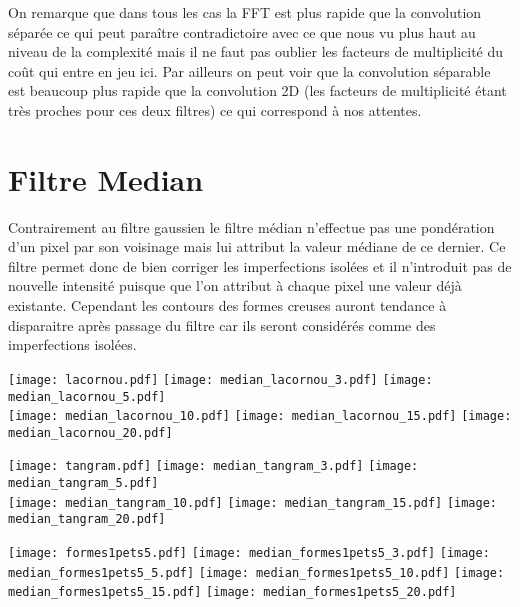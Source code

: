 \documentclass[12pt]{article}
\numberwithin{equation}{section}
\begin{document}
On remarque que dans tous les cas la FFT est plus rapide que la convolution séparée ce qui peut paraître contradictoire avec ce que nous vu plus haut au niveau de la complexité mais il ne faut pas oublier les facteurs de multiplicité du coût qui entre en jeu ici. Par ailleurs on peut voir que la convolution séparable est beaucoup plus rapide que la convolution 2D (les facteurs de multiplicité étant très proches pour ces deux filtres) ce qui correspond à nos attentes.

\section{Filtre Median}
Contrairement au filtre gaussien le filtre médian n'effectue pas une pondération d'un pixel par son voisinage mais lui attribut la valeur médiane de ce dernier. Ce filtre permet donc de bien corriger les imperfections isolées et il n'introduit pas de nouvelle intensité puisque que l'on attribut à chaque pixel une valeur déjà existante. Cependant les contours des formes creuses auront tendance à disparaitre après passage du filtre car ils seront considérés comme des imperfections isolées.
\begin{center}
\texttt{[image: lacornou.pdf]}
\texttt{[image: median\_lacornou\_3.pdf]}
\texttt{[image: median\_lacornou\_5.pdf]}\\
\texttt{[image: median\_lacornou\_10.pdf]}
\texttt{[image: median\_lacornou\_15.pdf]}
\texttt{[image: median\_lacornou\_20.pdf]}
\end{center}
\begin{center}
\texttt{[image: tangram.pdf]}
\texttt{[image: median\_tangram\_3.pdf]}
\texttt{[image: median\_tangram\_5.pdf]}\\
\texttt{[image: median\_tangram\_10.pdf]}
\texttt{[image: median\_tangram\_15.pdf]}
\texttt{[image: median\_tangram\_20.pdf]}
\end{center}

\begin{center}
\texttt{[image: formes1pets5.pdf]}
\texttt{[image: median\_formes1pets5\_3.pdf]}
\texttt{[image: median\_formes1pets5\_5.pdf]}
\texttt{[image: median\_formes1pets5\_10.pdf]}
\texttt{[image: median\_formes1pets5\_15.pdf]}
\texttt{[image: median\_formes1pets5\_20.pdf]}
\end{center}
\end{document}

